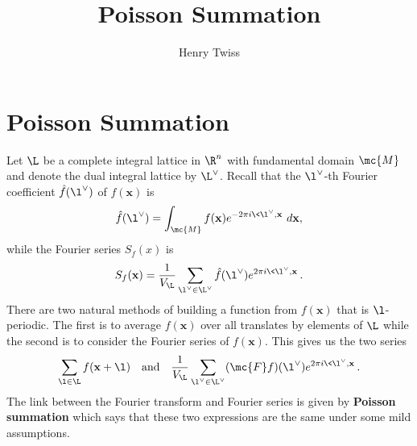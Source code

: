 \documentclass[12pt]{article}
\title{Poisson Summation}
\author{Henry Twiss}
\begin{document}
  \date{}
  \maketitle
  \section{Poisson Summation}
    Let \(\L\) be a complete integral lattice in \(\R^{n}\) with fundamental domain \(\mc{M}\) and denote the dual integral lattice by \(\L^{\vee}\). Recall that the \(\l^{\vee}\)-th Fourier coefficient \(\hat{f}(\l^{\vee})\) of \(f(\mathbf{x})\) is
    \[
      \hat{f}(\l^{\vee}) = \int_{\mc{M}}f(\mathbf{x})e^{-2\pi i\<\l^{\vee},\mathbf{x}\>}\,d\mathbf{x},
    \]
    while the Fourier series \(S_{f}(x)\) is
    \[
      S_{f}(\mathbf{x}) = \frac{1}{V_{\L}}\sum_{\l^{\vee} \in \L^{\vee}}\hat{f}(\l^{\vee})e^{2\pi i\<\l^{\vee},\mathbf{x}\>}.
    \]
    There are two natural methods of building a function from \(f(\mathbf{x})\) that is \(\l\)-periodic. The first is to average \(f(\mathbf{x})\) over all translates by elements of \(\L\) while the second is to consider the Fourier series of \(f(\mathbf{x})\). This gives us the two series
    \[
      \sum_{\l \in \L}f(\mathbf{x}+\l) \quad \text{and} \quad \frac{1}{V_{\L}}\sum_{\l^{\vee} \in \L^{\vee}}(\mc{F}f)(\l^{\vee})e^{2\pi i\<\l^{\vee},\mathbf{x}\>}.
    \]
    The link between the Fourier transform and Fourier series is given by \textbf{Poisson summation} which says that these two expressions are the same under some mild assumptions.
\end{document}
